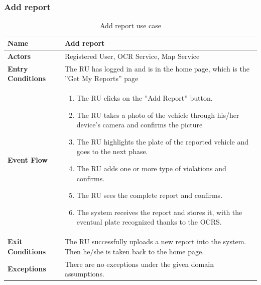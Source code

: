 					\subsubsection{Add report}
					\begin{table}[!h]
						\centering
						\vspace{-4.5mm}
						\begin{tabular}{lp{}}
							\toprule
							\textbf{Name} & \textbf{Add report} \\[1mm]
							\midrule
							\textbf{Actors} & Registered User, OCR Service, Map Service\\[1mm]
							\textbf{Entry Conditions} & The RU has logged in and is in the home page, which is the ''Get My Reports'' page \vspace{1mm}\\
							\textbf{Event Flow} &
							\vspace{-5mm} 
							\begin{enumerate}
								\setlength\itemsep{0.1mm}
								\item The RU clicks on the ''Add Report'' button.
								\item The RU takes a photo of the vehicle through his/her device's camera and confirms the picture
								\item The RU highlights the plate of the reported vehicle and goes to the next phase.
								\item The RU adds one or more type of violations and confirms.
								\item The RU sees the complete report and confirms.
								\item The system receives the report and stores it, with the eventual plate recognized thanks to the OCRS.
							\end{enumerate} \\				
							\textbf{Exit Conditions} & The RU successfully uploads a new report into the system. Then he/she is taken back to the home page.\vspace{1mm}\\
							\textbf{Exceptions} & There are no exceptions under the given domain assumptions. \\[1mm]
							\bottomrule
						\end{tabular}
						\caption{Add report use case}
					\end{table}
					\clearpage

